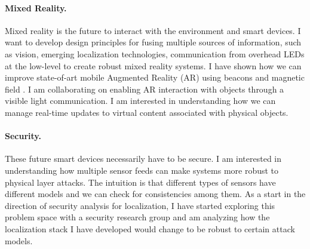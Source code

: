 \documentclass[10pt]{article}
\begin{document}
\paragraph{Mixed Reality. }
Mixed reality is the future to interact with the environment and smart devices. I want to develop design principles for fusing multiple sources of information, such as vision, emerging localization technologies, communication from overhead LEDs at the low-level to create robust mixed reality systems. %
I have shown how we can improve state-of-art mobile Augmented Reality (AR) using beacons and magnetic field \cite{mobileAR}. I am collaborating on enabling AR interaction with objects through a visible light communication. I am interested in understanding how we can manage real-time updates to virtual content associated with physical objects. 

\paragraph{Security. }
These future smart devices necessarily have to be secure. I am interested in understanding how multiple sensor feeds can make systems more robust to physical layer attacks. The intuition is that different types of sensors have different models and we can check for consistencies among them. %
As a start in the direction of security analysis for localization, I have started exploring this problem space with a security research group and am analyzing how the localization stack I have developed would change to be robust to certain attack models. 
\end{document}

